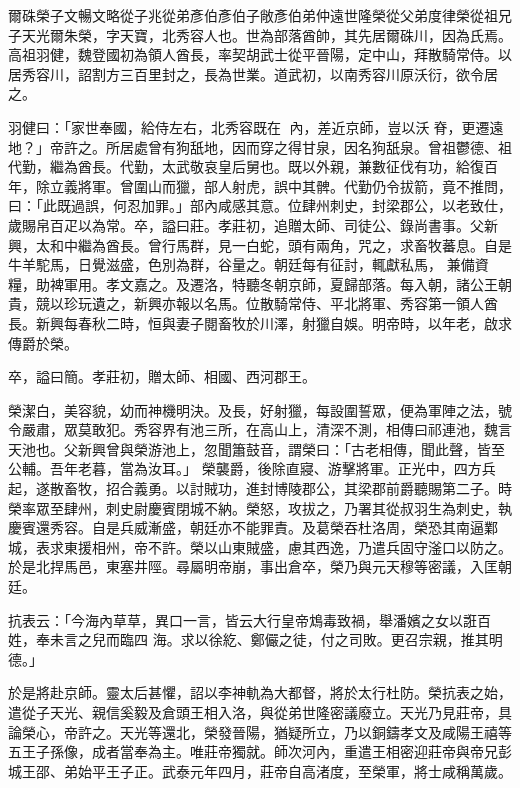 
\begin{pinyinscope}

 爾硃榮子文暢文略從子兆從弟彥伯彥伯子敞彥伯弟仲遠世隆榮從父弟度律榮從祖兄子天光爾朱榮，字天寶，北秀容人也。世為部落酋帥，其先居爾硃川，因為氏焉。高祖羽健，魏登國初為領人酋長，率契胡武士從平晉陽，定中山，拜散騎常侍。以居秀容川，詔割方三百里封之，長為世業。道武初，以南秀容川原沃衍，欲令居之。



 羽健曰：「家世奉國，給侍左右，北秀容既在
 內，差近京師，豈以沃脊，更遷遠地？」帝許之。所居處曾有狗舐地，因而穿之得甘泉，因名狗舐泉。曾祖鬱德、祖代勤，繼為酋長。代勤，太武敬哀皇后舅也。既以外親，兼數征伐有功，給復百年，除立義將軍。曾圍山而獵，部人射虎，誤中其髀。代勤仍令拔箭，竟不推問，曰：「此既過誤，何忍加罪。」部內咸感其意。位肆州刺史，封梁郡公，以老致仕，歲賜帛百疋以為常。卒，謚曰莊。孝莊初，追贈太師、司徒公、錄尚書事。父新興，太和中繼為酋長。曾行馬群，見一白蛇，頭有兩角，咒之，求畜牧蕃息。自是牛羊駝馬，日覺滋盛，色別為群，谷量之。朝廷每有征討，輒獻私馬，
 兼備資糧，助裨軍用。孝文嘉之。及遷洛，特聽冬朝京師，夏歸部落。每入朝，諸公王朝貴，競以珍玩遺之，新興亦報以名馬。位散騎常侍、平北將軍、秀容第一領人酋長。新興每春秋二時，恒與妻子閱畜牧於川澤，射獵自娛。明帝時，以年老，啟求傳爵於榮。



 卒，謚曰簡。孝莊初，贈太師、相國、西河郡王。



 榮潔白，美容貌，幼而神機明決。及長，好射獵，每設圍誓眾，便為軍陣之法，號令嚴肅，眾莫敢犯。秀容界有池三所，在高山上，清深不測，相傳曰祁連池，魏言天池也。父新興曾與榮游池上，忽聞簫鼓音，謂榮曰：「古老相傳，聞此聲，皆至公輔。吾年老暮，當為汝耳。」
 榮襲爵，後除直寢、游擊將軍。正光中，四方兵起，遂散畜牧，招合義勇。以討賊功，進封博陵郡公，其梁郡前爵聽賜第二子。時榮率眾至肆州，刺史尉慶賓閉城不納。榮怒，攻拔之，乃署其從叔羽生為刺史，執慶賓還秀容。自是兵威漸盛，朝廷亦不能罪責。及葛榮吞杜洛周，榮恐其南逼鄴城，表求東援相州，帝不許。榮以山東賊盛，慮其西逸，乃遣兵固守滏口以防之。於是北捍馬邑，東塞井陘。尋屬明帝崩，事出倉卒，榮乃與元天穆等密議，入匡朝廷。



 抗表云：「今海內草草，異口一言，皆云大行皇帝鴆毒致禍，舉潘嬪之女以誑百姓，奉未言之兒而臨四
 海。求以徐紇、鄭儼之徒，付之司敗。更召宗親，推其明德。」



 於是將赴京師。靈太后甚懼，詔以李神軌為大都督，將於太行杜防。榮抗表之始，遣從子天光、親信奚毅及倉頭王相入洛，與從弟世隆密議廢立。天光乃見莊帝，具論榮心，帝許之。天光等還北，榮發晉陽，猶疑所立，乃以銅鑄孝文及咸陽王禧等五王子孫像，成者當奉為主。唯莊帝獨就。師次河內，重遣王相密迎莊帝與帝兄彭城王邵、弟始平王子正。武泰元年四月，莊帝自高渚度，至榮軍，將士咸稱萬歲。




\end{pinyinscope}

